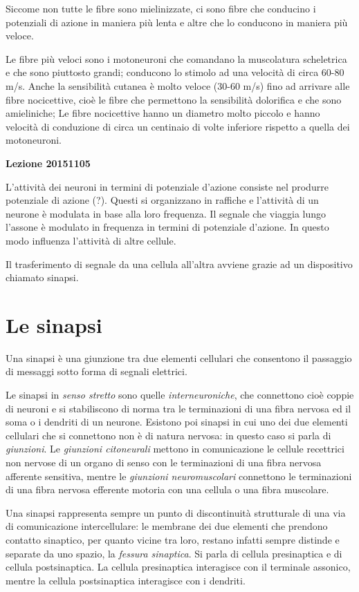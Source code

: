 \documentclass[]{article}
\begin{document}
Siccome non tutte le fibre sono mielinizzate, ci sono fibre che
conducino i potenziali di azione in maniera più lenta e altre che lo
conducono in maniera più veloce.

Le fibre più veloci sono i motoneuroni che comandano la muscolatura
scheletrica e che sono piuttosto grandi; conducono lo stimolo ad una
velocità di circa 60-80 m/s. Anche la sensibilità cutanea è molto veloce
(30-60 m/s) fino ad arrivare alle fibre nocicettive, cioè le fibre che
permettono la sensibilità dolorifica e che sono amieliniche; Le fibre
nocicettive hanno un diametro molto piccolo e hanno velocità di
conduzione di circa un centinaio di volte inferiore rispetto a quella
dei motoneuroni.

\textbf{Lezione 20151105}

L'attività dei neuroni in termini di potenziale d'azione consiste nel
produrre potenziale di azione (?). Questi si organizzano in raffiche e
l'attività di un neurone è modulata in base alla loro frequenza. Il
segnale che viaggia lungo l'assone è modulato in frequenza in termini di
potenziale d'azione. In questo modo influenza l'attività di altre
cellule.

Il trasferimento di segnale da una cellula all'altra avviene grazie ad
un dispositivo chiamato sinapsi.

\section{Le sinapsi}\label{le-sinapsi}

Una sinapsi è una giunzione tra due elementi cellulari che consentono il
passaggio di messaggi sotto forma di segnali elettrici.

Le sinapsi in \emph{senso stretto} sono quelle \emph{interneuroniche},
che connettono cioè coppie di neuroni e si stabiliscono di norma tra le
terminazioni di una fibra nervosa ed il soma o i dendriti di un neurone.
Esistono poi sinapsi in cui uno dei due elementi cellulari che si
connettono non è di natura nervosa: in questo caso si parla di
\emph{giunzioni}. Le \emph{giunzioni citoneurali} mettono in
comunicazione le cellule recettrici non nervose di un organo di senso
con le terminazioni di una fibra nervosa afferente sensitiva, mentre le
\emph{giunzioni neuromuscolari} connettono le terminazioni di una fibra
nervosa efferente motoria con una cellula o una fibra muscolare.

Una sinapsi rappresenta sempre un punto di discontinuità strutturale di
una via di comunicazione intercellulare: le membrane dei due elementi
che prendono contatto sinaptico, per quanto vicine tra loro, restano
infatti sempre distinde e separate da uno spazio, la \emph{fessura
sinaptica}. Si parla di cellula presinaptica e di cellula postsinaptica.
La cellula presinaptica interagisce con il terminale assonico, mentre la
cellula postsinaptica interagisce con i dendriti.
\end{document}
